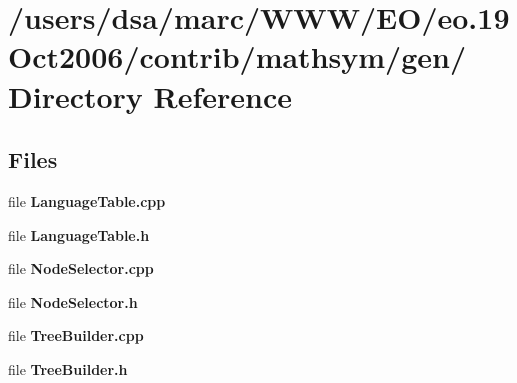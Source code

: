 \section{/users/dsa/marc/WWW/EO/eo.19Oct2006/contrib/mathsym/gen/ Directory Reference}
\label{dir_000024}
\subsection*{Files}
\begin{CompactItemize}
\item 
file {\bf LanguageTable.cpp}
\item 
file {\bf LanguageTable.h}
\item 
file {\bf NodeSelector.cpp}
\item 
file {\bf NodeSelector.h}
\item 
file {\bf TreeBuilder.cpp}
\item 
file {\bf TreeBuilder.h}
\end{CompactItemize}
